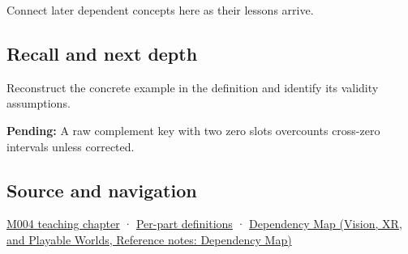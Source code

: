 Connect later dependent concepts here as their lessons arrive.

\subsection{Recall and next depth}\label{appendix-deca299ae4b8-recall-and-next-depth}

Reconstruct the concrete example in the definition and identify its validity assumptions.

\textbf{Pending:} A raw complement key with two zero slots overcounts cross-zero intervals unless corrected.

\subsection{Source and navigation}\label{appendix-deca299ae4b8-source-and-navigation}

\hyperref[01-foundations-i-ch001-a-stretching-ruler-for-real-valued-quantities]{M004 teaching chapter} · \hyperref[appendix-fd090d982a15-m004---parts-61-76]{Per-part definitions} · \href{../07-Vision-XR-and-Playable-Worlds/main.pdf\#nameddest=appendix-4ad47bdd269a}{Dependency Map (Vision, XR, and Playable Worlds, Reference notes: Dependency Map)}
